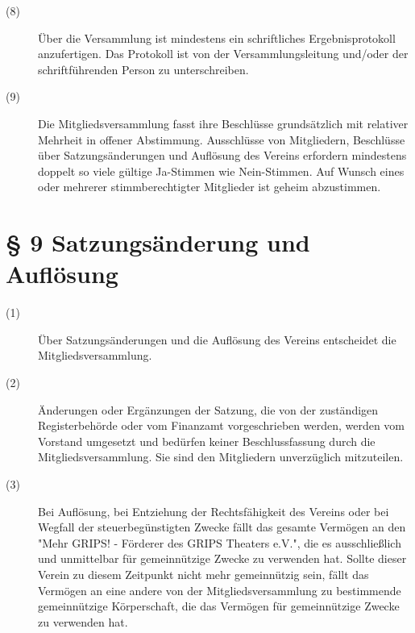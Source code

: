 \documentclass[a4paper,12pt]{scrartcl}
\begin{document}
\begin{description}
\item[(8)] Über die Versammlung ist mindestens ein schriftliches Ergebnisprotokoll anzufertigen. Das Protokoll ist von der Versammlungsleitung und/oder der schriftführenden Person zu unterschreiben.
\item[(9)] Die Mitgliedsversammlung fasst ihre Beschlüsse grundsätzlich mit relativer Mehrheit in offener Abstimmung. Ausschlüsse von Mitgliedern, Beschlüsse über Satzungsänderungen und Auflösung des Vereins erfordern mindestens doppelt so viele gültige Ja-Stimmen wie Nein-Stimmen. Auf Wunsch eines oder mehrerer stimmberechtigter Mitglieder ist geheim abzustimmen.

\end{description}


\section*{\S{} 9 Satzungsänderung und Auflösung}
\begin{description} 

\item[(1)] Über Satzungsänderungen und die Auflösung des Vereins entscheidet die Mitgliedsversammlung.
\item[(2)] Änderungen oder Ergänzungen der Satzung, die von der zuständigen Registerbehörde oder vom Finanzamt vorgeschrieben werden, werden vom Vorstand umgesetzt und bedürfen keiner Beschlussfassung durch die Mitgliedsversammlung. Sie sind den Mitgliedern unverzüglich mitzuteilen.
\item[(3)] Bei Auflösung, bei Entziehung der Rechtsfähigkeit des Vereins oder bei Wegfall der steuerbegünstigten Zwecke fällt das gesamte Vermögen an den "Mehr GRIPS! - Förderer des GRIPS Theaters e.V.", die es ausschließlich und unmittelbar für gemeinnützige Zwecke zu verwenden hat. Sollte dieser Verein zu diesem Zeitpunkt nicht mehr gemeinnützig sein, fällt das Vermögen an eine andere von der Mitgliedsversammlung zu bestimmende gemeinnützige Körperschaft, die das Vermögen für gemeinnützige Zwecke zu verwenden hat.

\end{description}
\end{document}
